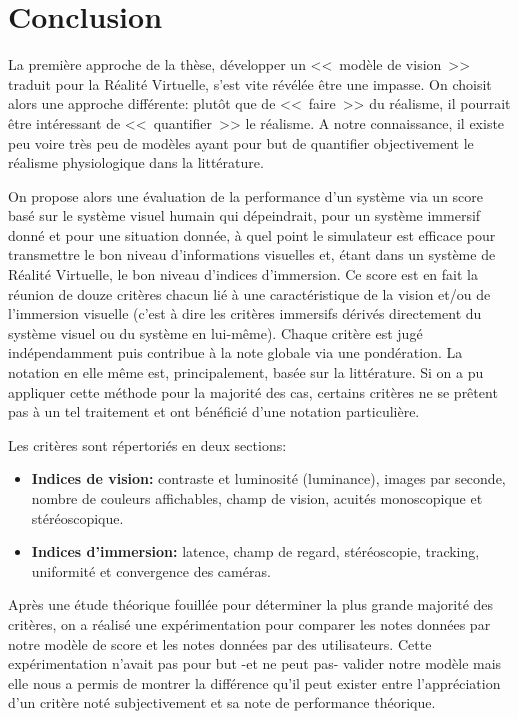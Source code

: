 \chapter*{Conclusion}
\par La première approche de la thèse, développer un <<~modèle de vision~>> traduit pour la Réalité Virtuelle, s'est vite révélée être une impasse. On choisit alors une approche différente: plutôt que de <<~faire~>> du réalisme, il pourrait être intéressant de <<~quantifier~>> le réalisme. A notre connaissance, il existe peu voire très peu de modèles ayant pour but de quantifier objectivement le réalisme physiologique dans la littérature.

\par On propose alors une évaluation de la performance d'un système via un score basé sur le système visuel humain qui dépeindrait, pour un système immersif donné et pour une situation donnée, à quel point le simulateur est efficace pour transmettre le bon niveau d'informations visuelles et, étant dans un système de Réalité Virtuelle, le bon niveau d'indices d'immersion. Ce score est en fait la réunion de douze critères chacun lié à une caractéristique de la vision et/ou de l'immersion visuelle (c'est à dire les critères immersifs dérivés directement du système visuel ou du système en lui-même). Chaque critère est jugé indépendamment puis contribue à la note globale via une pondération. La notation en elle même est, principalement, basée sur la littérature. Si on a pu appliquer cette méthode pour la majorité des cas, certains critères ne se prêtent pas à un tel traitement et ont bénéficié d'une notation particulière.

\par Les critères sont répertoriés en deux sections:
	
\begin{itemize}\itemsep12pt
	\item \textbf{Indices de vision:} contraste et luminosité (luminance), images par seconde, nombre de couleurs affichables, champ de vision, acuités monoscopique et stéréoscopique.
	\item \textbf{Indices d'immersion:} latence, champ de regard, stéréoscopie, tracking, uniformité et convergence des caméras.
\end{itemize}
	
\par Après une étude théorique fouillée pour déterminer la plus grande majorité des critères, on a réalisé une expérimentation pour comparer les notes données par notre modèle de score et les notes données par des utilisateurs. Cette expérimentation n'avait pas pour but -et ne peut pas- valider notre modèle mais elle nous a permis de montrer la différence qu'il peut exister entre l'appréciation d'un critère noté subjectivement et sa note de performance théorique.

